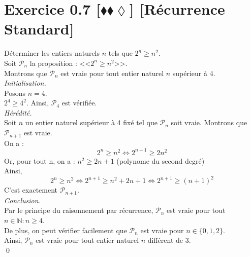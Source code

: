 \documentclass[10pt]{article}
\begin{document}
\section*{Exercice 0.7 [$\blacklozenge\blacklozenge\lozenge$] [Récurrence Standard]}
\begin{tcolorbox}[enhanced, width=7in, center, size=fbox, fontupper=\large, drop shadow southwest]
    Déterminer les entiers naturels $n$ tels que $2^n\geq n^2$.\\
    Soit $\mathcal{P}_n$ la proposition : <<$2^n\geq n^2$>>.\\
    Montrons que $\mathcal{P}_n$ est vraie pour tout entier naturel $n$ supérieur à 4.\\[0.5cm]
    \emph{Initialisation.}\\
    Posons $n=4$.\\
    $2^4 \geq 4^2$. Ainsi, $\mathcal{P}_4$ est vérifiée.\\[0.5cm]
    \emph{Hérédité.}\\
    Soit $n$ un entier naturel supérieur à 4 fixé tel que $\mathcal{P}_n$ soit vraie. Montrons que $\mathcal{P}_{n+1}$ est vraie.\\
    On a :
    \begin{equation*}
        2^n \geq n^2 \iff 2^{n+1} \geq 2n^2
    \end{equation*}
    Or, pour tout n, on a : $n^2 \geq 2n + 1$ (polynome du second degré)\\
    Ainsi,
    \begin{equation*}
        2^n \geq n^2 \iff 2^{n+1} \geq n^2 + 2n + 1 \iff 2^{n+1} \geq (n+1)^2
    \end{equation*}
    C'est exactement $\mathcal{P}_{n+1}$.\\[0.5cm]
    \emph{Conclusion.}\\
    Par le principe du raisonnement par récurrence, $\mathcal{P}_n$ est vraie pour tout $n\in\mathbb{N} : n\geq4$.\\
    De plus, on peut vérifier facilement que $\mathcal{P}_n$ est vraie pour $n\in\{0,1,2\}$.\\
    Ainsi, $\mathcal{P}_n$ est vraie pour tout entier naturel $n$ différent de 3.\\
    \qed
\end{tcolorbox}
\end{document}
